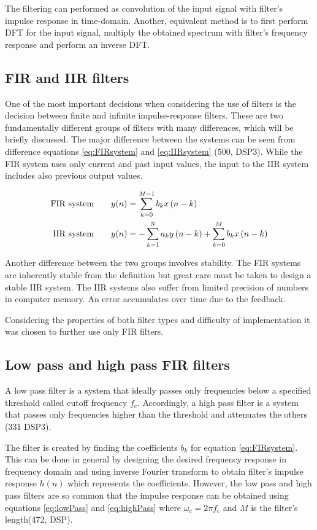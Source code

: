 The filtering can performed as convolution of the input signal with filter's impulse response in time-domain. Another, equivalent method is to first perform DFT for the input signal, multiply the obtained spectrum with filter's frequency response and perform an inverse DFT. 

\subsection{FIR and IIR filters}
\label{ssec:FIRandIIR}
One of the most important decisions when considering the use of filters is the decision between finite and infinite impulse-response filters. These are two fundamentally different groups of filters with many differences, which will be briefly discussed. The major difference between the systems can be seen from difference equations \ref{eq:FIRsystem} and \ref{eq:IIRsystem} (500, DSP3). While the FIR system uses only current and past input values, the input to the IIR system includes also previous output values.

\begin{align}
	\text{FIR system\qquad} &y(n)= \sum\limits_{k=0}^{M-1}b_kx\,(n-k) \label{eq:FIRsystem}\\
	\text{IIR system\qquad} &y(n)= -\sum\limits_{k=1}^{N}a_ky\,(n-k) + \sum\limits_{k=0}^{M}b_kx\,(n-k) \label{eq:IIRsystem}
\end{align}

Another difference between the two groups involves stability. The FIR systems are inherently stable from the definition but great care must be taken to design a stable IIR system. The IIR systems also suffer from limited precision of numbers in computer memory. An error accumulates over time due to the feedback. 

Considering the properties of both filter types and difficulty of implementation it was chosen to further use only FIR filters.

\subsection{Low pass and high pass FIR filters}
A low pass filter is a system that ideally passes only frequencies below a specified threshold called cutoff frequency $f_c$. Accordingly, a high pass filter is a system that passes only frequencies higher than the threshold and attenuates the others (331 DSP3). 

The filter is created by finding the coefficients $b_k$ for equation \ref{eq:FIRsystem}. This can be done in general by designing the desired frequency response in frequency domain and using inverse Fourier transform to obtain filter's impulse response $h(n)$ which represents the coefficients. However, the low pass and high pass filters are so common that the impulse response can be obtained using equations \ref{eq:lowPass} and \ref{eq:highPass} where $\omega_c = 2 \pi f_c$ and $M$ is the filter's length(472, DSP).

